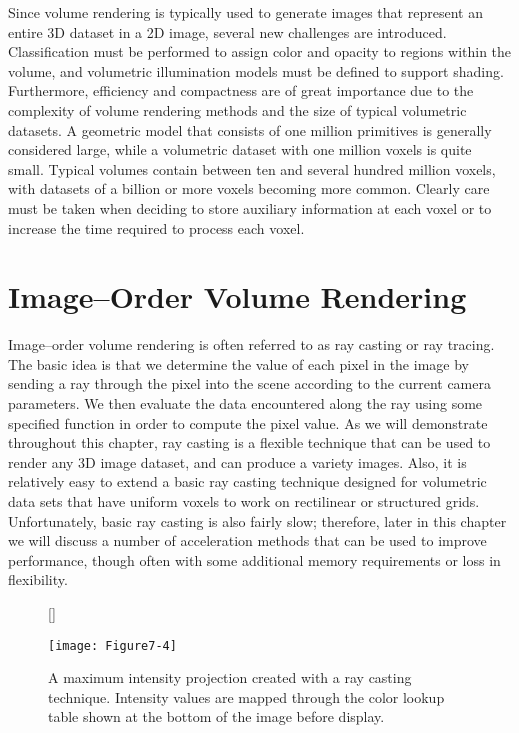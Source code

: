 Since volume rendering is typically used to generate images that represent an entire 3D dataset in a 2D image, several new challenges are introduced. Classification must be performed to assign color and opacity to regions within the volume, and volumetric illumination models must be defined to support shading. Furthermore, efficiency and compactness are of great importance due to the complexity of volume rendering methods and the size of typical volumetric datasets. A geometric model that consists of one million primitives is generally considered large, while a volumetric dataset with one million voxels is quite small. Typical volumes contain between ten and several hundred million voxels, with datasets of a billion or more voxels becoming more common. Clearly care must be taken when deciding to store auxiliary information at each voxel or to increase the time required to process each voxel.

\section{Image--Order Volume Rendering}

Image--order volume rendering is often referred to as ray casting or ray tracing. The basic idea is that we determine the value of each pixel in the image by sending a ray through the pixel into the scene according to the current camera parameters. We then evaluate the data encountered along the ray using some specified function in order to compute the pixel value. As we will demonstrate throughout this chapter, ray casting is a flexible technique that can be used to render any 3D image dataset, and can produce a variety images. Also, it is relatively easy to extend a basic ray casting technique designed for volumetric data sets that have uniform voxels to work on rectilinear or structured grids. Unfortunately, basic ray casting is also fairly slow; therefore, later in this chapter we will discuss a number of acceleration methods that can be used to improve performance, though often with some additional memory requirements or loss in flexibility.

\begin{figure}[!htb]
	[\FBwidth]
	{\caption{A maximum intensity projection created with a ray casting technique. Intensity values are mapped through the color lookup table shown at the bottom of the image before display.}\label{fig:Figure7-4}}
	{\texttt{[image: Figure7-4]}}
\end{figure}


